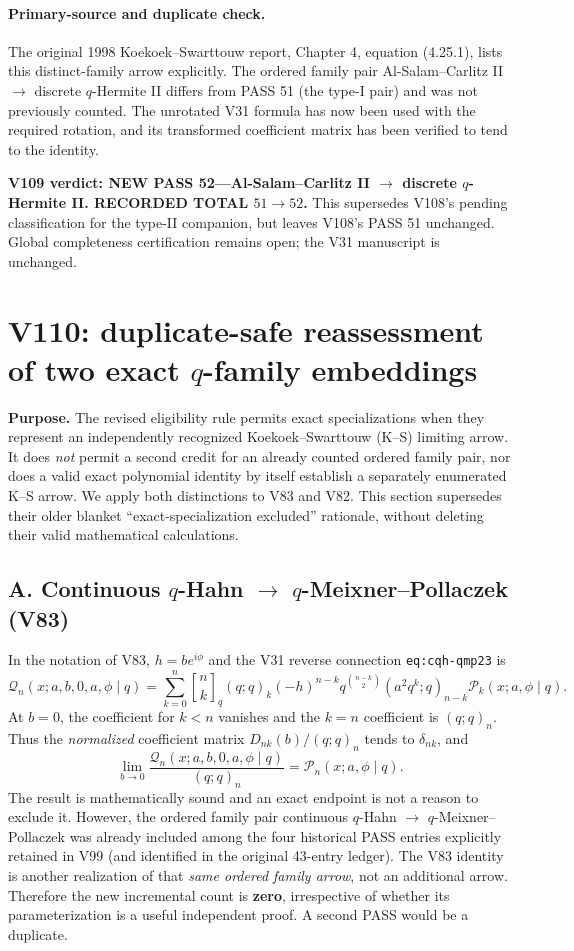 \documentclass[11pt]{article}
\begin{document}
\paragraph{Primary-source and duplicate check.}
The original 1998 Koekoek--Swarttouw report, Chapter 4, equation (4.25.1), lists this distinct-family arrow explicitly. The ordered family pair Al-Salam--Carlitz II $\to$ discrete $q$-Hermite II differs from PASS 51 (the type-I pair) and was not previously counted. The unrotated V31 formula has now been used with the required rotation, and its transformed coefficient matrix has been verified to tend to the identity.

\noindent\textbf{V109 verdict: NEW PASS 52---Al-Salam--Carlitz II $\to$ discrete $q$-Hermite II. RECORDED TOTAL $51\to52$.} This supersedes V108's pending classification for the type-II companion, but leaves V108's PASS 51 unchanged. Global completeness certification remains open; the V31 manuscript is unchanged.



\clearpage
\section{V110: duplicate-safe reassessment of two exact $q$-family embeddings}
\noindent\textbf{Purpose.} The revised eligibility rule permits exact specializations when they represent an independently recognized Koekoek--Swarttouw (K--S) limiting arrow. It does \emph{not} permit a second credit for an already counted ordered family pair, nor does a valid exact polynomial identity by itself establish a separately enumerated K--S arrow. We apply both distinctions to V83 and V82. This section supersedes their older blanket ``exact-specialization excluded'' rationale, without deleting their valid mathematical calculations.

\subsection*{A. Continuous $q$-Hahn $\to$ $q$-Meixner--Pollaczek (V83)}
In the notation of V83, $h=be^{i\phi}$ and the V31 reverse connection \texttt{eq:cqh-qmp23} is
\[
 \mathscr Q_n(x;a,b,0,a,\phi\mid q)
 =\sum_{k=0}^n {n\brack k}_q(q;q)_k
 (-h)^{n-k}q^{\binom{n-k}{2}}(a^2q^k;q)_{n-k}
 \mathscr P_k(x;a,\phi\mid q).
\]
At $b=0$, the coefficient for $k<n$ vanishes and the $k=n$ coefficient is $(q;q)_n$. Thus the \emph{normalized} coefficient matrix $D_{nk}(b)/(q;q)_n$ tends to $\delta_{nk}$, and
\[
 \lim_{b\to0}\frac{\mathscr Q_n(x;a,b,0,a,\phi\mid q)}{(q;q)_n}
 =\mathscr P_n(x;a,\phi\mid q).
\]
The result is mathematically sound and an exact endpoint is not a reason to exclude it. However, the ordered family pair continuous $q$-Hahn $\to$ $q$-Meixner--Pollaczek was already included among the four historical PASS entries explicitly retained in V99 (and identified in the original 43-entry ledger). The V83 identity is another realization of that \emph{same ordered family arrow}, not an additional arrow. Therefore the new incremental count is \textbf{zero}, irrespective of whether its parameterization is a useful independent proof. A second PASS would be a duplicate.
\end{document}
